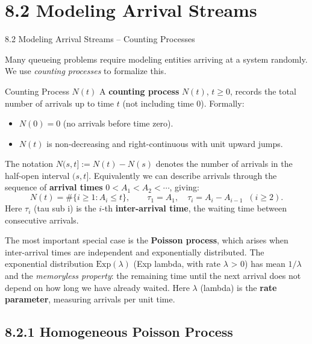 \documentclass[aspectratio=169,10pt]{beamer}
\begin{document}
\section{8.2 Modeling Arrival Streams}

\begin{frame}[allowframebreaks]{8.2 Modeling Arrival Streams -- Counting Processes}

Many queueing problems require modeling entities arriving at a system randomly.
We use \emph{counting processes} to formalize this.

\begin{block}{Counting Process $N(t)$}
A \textbf{counting process} $N(t)$, $t \ge 0$, records the total number of
arrivals up to time $t$ (not including time 0).  Formally:
\begin{itemize}
  \item $N(0) = 0$ (no arrivals before time zero).
  \item $N(t)$ is non-decreasing and right-continuous with unit upward jumps.
\end{itemize}
The notation $N(s,t] := N(t) - N(s)$ denotes the number of arrivals in the
half-open interval $(s,t]$.  Equivalently we can describe arrivals through the
sequence of \textbf{arrival times} $0 < A_1 < A_2 < \cdots$, giving:
\[
  N(t) = \#\{i \ge 1 : A_i \le t\}, \qquad
  \tau_1 = A_1,\quad \tau_i = A_i - A_{i-1} \;\;(i \ge 2).
\]
Here $\tau_i$ (tau sub i) is the $i$-th \textbf{inter-arrival time}, the waiting
time between consecutive arrivals.
\end{block}

The most important special case is the \textbf{Poisson process}, which arises
when inter-arrival times are independent and exponentially distributed.  The
exponential distribution $\mathrm{Exp}(\lambda)$ (Exp lambda, with rate
$\lambda$ > 0) has mean $1/\lambda$ and the \emph{memoryless property}: the
remaining time until the next arrival does not depend on how long we have
already waited.  Here $\lambda$ (lambda) is the \textbf{rate parameter},
measuring arrivals per unit time.

\end{frame}

\subsection{8.2.1 Homogeneous Poisson Process}
\end{document}
